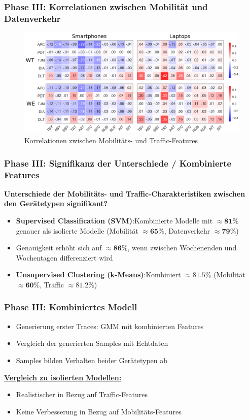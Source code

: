 \documentclass{beamer}
\begin{document}
\begin{frame}
  \frametitle{Phase III: Korrelationen zwischen Mobilität und Datenverkehr}
  \begin{figure}
    \centering
    \includegraphics[width=\textwidth]{images/correlations.png}
    \caption*{Korrelationen zwischen Mobilitäts- und Traffic-Features}
  \end{figure}
\end{frame}

\begin{frame}
  \frametitle{Phase III: Signifikanz der Unterschiede / Kombinierte Features}
  \textbf{Unterschiede der Mobilitäts- und Traffic-Charakteristiken zwischen den Gerätetypen signifikant?}\newline
  \begin{itemize}
    \item \textbf{Supervised Classification (SVM)}:\newline Kombinierte Modelle mit $\approx \boldsymbol{81\%}$ genauer als isolierte Modelle (Mobilität $\approx \boldsymbol{65 \%}$, Datenverkehr $\approx \boldsymbol{79 \%}$)
    \item Genauigkeit erhöht sich auf $\approx \boldsymbol{86\%}$, wenn zwischen Wochenenden und Wochentagen differenziert wird    
    \item \textbf{Unsupervised Clustering (k-Means)}:\newline Kombiniert $\approx\boldsymbol{81.5 \%}$ (Mobilität $\approx \boldsymbol{60 \%}$, Traffic $\approx \boldsymbol{81.2 \%}$)
  \end{itemize}
\end{frame}

\begin{frame}
  \frametitle{Phase III: Kombiniertes Modell}
  \begin{itemize}
    \item Generierung erster Traces: GMM mit kombinierten Features
    \item Vergleich der generierten Samples mit Echtdaten
    \item Samples bilden Verhalten beider Gerätetypen ab
  \end{itemize}
  \vspace{15px}
  \textbf{\underline{Vergleich zu isolierten Modellen:}}
  \begin{itemize}
    \item Realistischer in Bezug auf Traffic-Features
    \item Keine Verbesserung in Bezug auf Mobilitäts-Features
  \end{itemize}
\end{frame}
\end{document}
